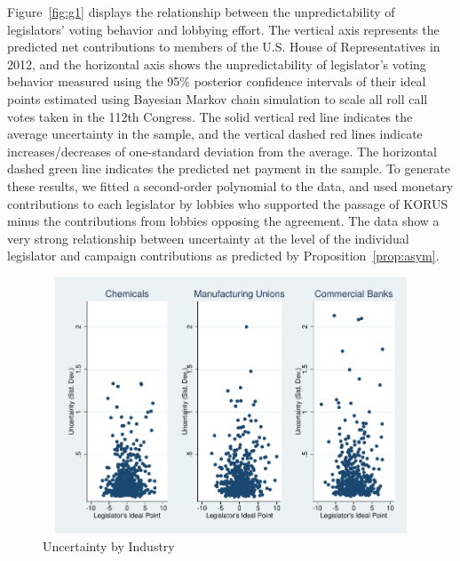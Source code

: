 \documentclass[12pt]{article}
\begin{document}
Figure~\ref{fig:g1} displays the relationship between the unpredictability of legislators' voting behavior and lobbying effort. The vertical axis represents the predicted net contributions to members of the U.S. House of Representatives in 2012, and the horizontal axis shows the unpredictability of legislator's voting behavior measured using the 95$\%$ posterior confidence intervals of their ideal points estimated using Bayesian Markov chain simulation to scale all roll call votes taken in the 112th Congress. The solid vertical red line indicates the average uncertainty in the sample, and the vertical dashed red lines indicate increases/decreases of one-standard deviation from the average. The horizontal dashed green line indicates the predicted net payment in the sample. To generate these results, we fitted a second-order polynomial to the data, and used monetary contributions to each legislator by lobbies who supported the passage of KORUS minus the contributions from lobbies opposing the agreement. The data show a very strong relationship between uncertainty at the level of the individual legislator and campaign contributions as predicted by Proposition~\ref{prop:asym}.

\begin{figure}
\begin{center}
\includegraphics[height=3in, width=6.5in]{NSF_combined_graph.pdf}
\end{center}
\caption{Uncertainty by Industry\label{fig:combined}}
\end{figure}
\end{document}
